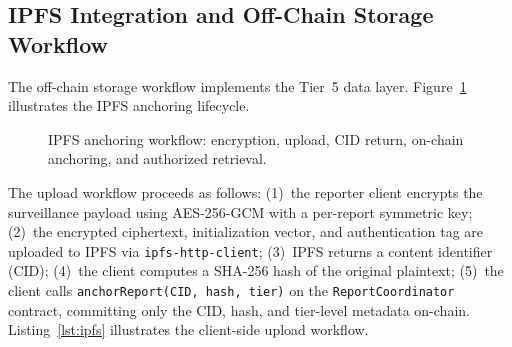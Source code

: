 \subsection{IPFS Integration and Off-Chain Storage Workflow}\label{subsec:ipfs_impl}

The off-chain storage workflow implements the Tier~5 data layer. Figure~\ref{fig:ipfs_workflow} illustrates the IPFS anchoring lifecycle.

\begin{figure}[!ht]
\centering
{}
\caption{IPFS anchoring workflow: encryption, upload, CID return, on-chain anchoring, and authorized retrieval.}\label{fig:ipfs_workflow}
\end{figure}

%
%

The upload workflow proceeds as follows: (1)~the reporter client encrypts the surveillance payload using AES-256-GCM with a per-report symmetric key; (2)~the encrypted ciphertext, initialization vector, and authentication tag are uploaded to IPFS via \texttt{ipfs-http-client}; (3)~IPFS returns a content identifier (CID); (4)~the client computes a SHA-256 hash of the original plaintext; (5)~the client calls \texttt{anchorReport(CID, hash, tier)} on the \texttt{ReportCoordinator} contract, committing only the CID, hash, and tier-level metadata on-chain. Listing~\ref{lst:ipfs} illustrates the client-side upload workflow.

